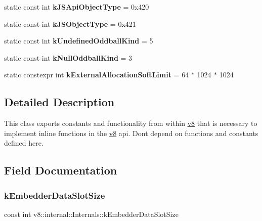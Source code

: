\begin{DoxyCompactItemize}
static const int {\bfseries k\+J\+S\+Api\+Object\+Type} = 0x420
\item 
\mbox{\label{classv8_1_1internal_1_1Internals_a56b7062df5d9a7df491137d4c3341bcc}} 
static const int {\bfseries k\+J\+S\+Object\+Type} = 0x421
\item 
\mbox{\label{classv8_1_1internal_1_1Internals_a39072b9e0ffea4031f4a1c514208b20d}} 
static const int {\bfseries k\+Undefined\+Oddball\+Kind} = 5
\item 
\mbox{\label{classv8_1_1internal_1_1Internals_a72243c5512cb5cab9d10b6f29e775180}} 
static const int {\bfseries k\+Null\+Oddball\+Kind} = 3
\item 
\mbox{\label{classv8_1_1internal_1_1Internals_af85a33cd47a2c9ed5faa4e1a85a6afce}} 
static constexpr int {\bfseries k\+External\+Allocation\+Soft\+Limit} = 64 $\ast$ 1024 $\ast$ 1024
\end{DoxyCompactItemize}


\subsection{Detailed Description}
This class exports constants and functionality from within \mbox{\hyperlink{namespacev8}{v8}} that is necessary to implement inline functions in the \mbox{\hyperlink{namespacev8}{v8}} api. Don\textquotesingle{}t depend on functions and constants defined here. 

\subsection{Field Documentation}
\mbox{\label{classv8_1_1internal_1_1Internals_a0947f712baffcb6772bd5e2ac5a47e1d}} 
\subsubsection{\texorpdfstring{k\+Embedder\+Data\+Slot\+Size}{kEmbedderDataSlotSize}}
{\footnotesize\ttfamily const int v8\+::internal\+::\+Internals\+::k\+Embedder\+Data\+Slot\+Size\hspace{0.3cm}{\ttfamily [static]}}

